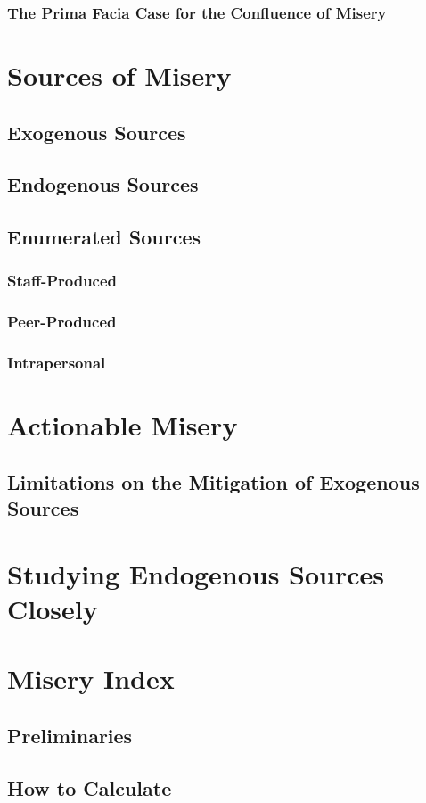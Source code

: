 \documentclass[UTF8]{article}
\begin{document}
	\subsubsection{The Prima Facia Case for the Confluence of Misery}

	\section{Sources of Misery}
	\subsection{Exogenous Sources}
	\subsection{Endogenous Sources}
	\subsection{Enumerated Sources}
	\subsubsection{Staff-Produced}
	\subsubsection{Peer-Produced}
	\subsubsection{Intrapersonal}

	\section{Actionable Misery}
	\subsection{Limitations on the Mitigation of Exogenous Sources}
	\section{Studying Endogenous Sources Closely}
	\section{Misery Index}
	\subsection{Preliminaries}
	\subsection{How to Calculate}
\end{document}
